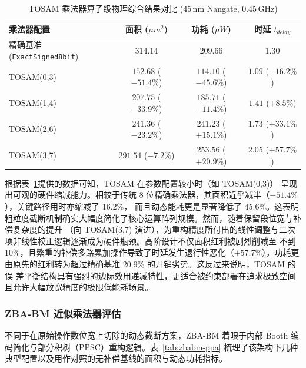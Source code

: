 \documentclass[12pt,a4paper,UTF8]{article}
\begin{document}
\begin{table}[htbp]
    \centering
    \caption{TOSAM 乘法器算子级物理综合结果对比 (45\,nm Nangate, 0.45\,GHz)}
    \label{tab:tosam-ppa}
    \small
    \setlength{\tabcolsep}{6pt}
    \begin{tabular}{lccc}
        \toprule
        乘法器配置 & 面积 ($\mu m^2$) & 功耗 ($\mu W$) & 时延 $t_{delay}$ \\
        \midrule
        精确基准 (\texttt{ExactSigned8bit})  & $314.14$            & $209.66$            & $1.30$  \\
        TOSAM(0,3)                         & $152.68$ ($-51.4\%$)  & $114.10$ ($-45.6\%$)  & $1.09$ ($-16.2\%$) \\
        TOSAM(1,4)                         & $207.75$ ($-33.9\%$) & $185.71$ ($-11.4\%$) & $1.41$ ($+8.5\%$) \\
        TOSAM(2,6)                         & $241.36$ ($-23.2\%$) & $241.23$ ($+15.1\%$) & $1.73$ ($+33.1\%$) \\
        TOSAM(3,7)                         & $291.54$ ($-7.2\%$) & $253.56$ ($+20.9\%$) & $2.05$ ($+57.7\%$) \\
        \bottomrule
    \end{tabular}
\end{table}

根据表~\ref{tab:tosam-ppa}提供的数据可知，TOSAM 在参数配置较小时（如 TOSAM(0,3)）
呈现出可观的硬件缩减能力。相较于传统 8 位精确乘法器，其面积近乎减半（$-51.4\%$），关键路径用时亦缩减了 16.2\%，
而且动态能耗更是显著降低了 45.6\%。这表明粗粒度截断机制确实大幅度简化了核心运算阵列规模。然而，随着保留段位宽与补偿复杂度的提升
（向 TOSAM(3,7) 演进），为重构精度所付出的线性调整与二次项非线性校正逻辑逐渐成为硬件瓶颈。高阶设计不仅面积红利被剧烈削减至
不到 10\%，且繁重的补偿多路累加操作导致了时延发生退行性恶化（$+57.7\%$），功耗更由原先的红利转为超过精确基准 20.9\% 的开销劣势。这反过来说明，TOSAM 的误
差平衡结构具有强烈的边际效用递减特性，更适合被约束部署在追求极致空间且允许大幅放宽精度的极限低能耗场景。

\subsubsection{ZBA-BM 近似乘法器评估}

不同于在原始操作数位宽上切除的动态截断方案，ZBA-BM 着眼于内部 Booth 编码简化与部分积树（PPSC）重构逻辑。表~\ref{tab:zbabm-ppa} 梳理了该架构下几种典型配置以及用作对照的无补偿基线的面积与动态功耗指标。
\end{document}
